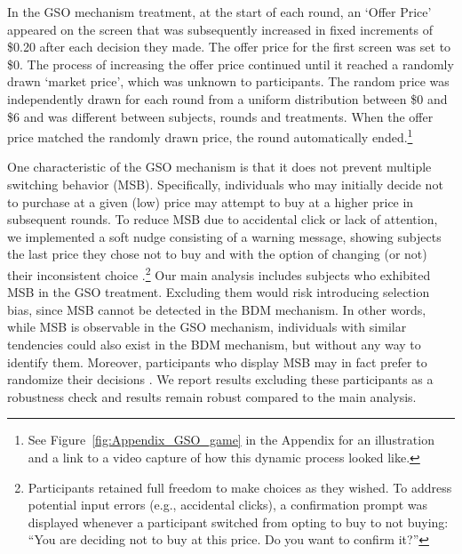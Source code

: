 \documentclass[12pt]{article}
\begin{document}
In the GSO mechanism treatment, at the start of each round, an `Offer Price' appeared on the screen that was subsequently increased in fixed increments of \$0.20 after each decision they made. %
The offer price for the first screen was set to \$0. The process of increasing the offer price continued until it reached a randomly drawn `market price', which was unknown to participants. The random price was independently drawn for each round from a uniform distribution between \$0 and \$6 and was different between subjects, rounds and treatments. When the offer price matched the randomly drawn price, the round automatically ended.\footnote{See Figure~\ref{fig:Appendix_GSO_game} in the Appendix for an illustration and a link to a video capture of how this dynamic process looked like.} 



One characteristic of the GSO mechanism is that it does not prevent multiple switching behavior (MSB). Specifically, individuals who may initially decide not to purchase at a given (low) price may attempt to buy at a higher price in subsequent rounds. To reduce MSB due to accidental click or lack of attention, we implemented a soft nudge consisting of a warning message, showing subjects the last price they chose not to buy and with the option of changing (or not) their inconsistent choice \citep{yu2021multiple}.\footnote{Participants retained full freedom to make choices as they wished. To address potential input errors (e.g., accidental clicks), a confirmation prompt was displayed whenever a participant switched from opting to buy to not buying: ``You are deciding not to buy at this price. Do you want to confirm it?''} 
Our main analysis includes subjects who exhibited MSB in the GSO treatment. Excluding them would risk introducing selection bias, since MSB cannot be detected in the BDM mechanism. In other words, while MSB is observable in the GSO mechanism, individuals with similar tendencies could also exist in the BDM mechanism, but without any way to identify them. 
Moreover,  participants who display MSB may in fact prefer to randomize their decisions \citep{agranov2017stochastic}. We report results excluding these participants as a robustness check and results remain robust compared to the main analysis.
    
\end{document}
